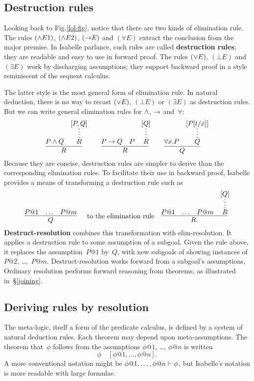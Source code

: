 \subsection{Destruction rules} \label{destruct}

Looking back to Fig.\ts\ref{fol-fig}, notice that there are two kinds of
elimination rule. The rules $({\wedge}E1)$, $({\wedge}E2)$, $({\rightarrow}E)$ and
$({\forall}E)$ extract the conclusion from the major premise. In Isabelle
parlance, such rules are called {\bf destruction rules}; they are readable
and easy to use in forward proof. The rules $({\vee}E)$, $({\bot}E)$ and
$({\exists}E)$ work by discharging assumptions; they support backward proof
in a style reminiscent of the sequent calculus.

The latter style is the most general form of elimination rule. In natural
deduction, there is no way to recast $({\vee}E)$, $({\bot}E)$ or
$({\exists}E)$ as destruction rules. But we can write general elimination
rules for $\wedge$, $\rightarrow$ and~$\forall$:
\[
    \infer{R}{P\conj Q & \infer*{R}{[P,Q]}} \qquad
    \infer{R}{P\imp Q & P & \infer*{R}{[Q]}}  \qquad
    \infer{Q}{\forall x.P & \infer*{Q}{[P[t/x]]}}
\]
Because they are concise, destruction rules are simpler to derive than the
corresponding elimination rules. To facilitate their use in backward
proof, Isabelle provides a means of transforming a destruction rule such as
\[ \infer[\quad\hbox{to the elimination rule}\quad]{Q}{P@1 & \ldots & P@m}
\infer{R.}{P@1 & \ldots & P@m & \infer*{R}{[Q]}}
\]
        {\bf Destruct-resolution} combines this
transformation with elim-resolution. It applies a destruction rule to some
assumption of a subgoal. Given the rule above, it replaces the
assumption~$P@1$ by~$Q$, with new subgoals of showing instances of $P@2$,
\ldots,~$P@m$. Destruct-resolution works forward from a subgoal's
assumptions. Ordinary resolution performs forward reasoning from theorems,
as illustrated in~\S\ref{joining}.

\subsection{Deriving rules by resolution}  \label{deriving}
The meta-logic, itself a form of the predicate calculus, is defined by a
system of natural deduction rules. Each theorem may depend upon
meta-assumptions. The theorem that~$\phi$ follows from the assumptions
$\phi@1$, \ldots, $\phi@n$ is written
\[ \phi \quad [\phi@1,\ldots,\phi@n]. \]
A more conventional notation might be $\phi@1,\ldots,\phi@n \turn \phi$,
but Isabelle's notation is more readable with large formulae.

